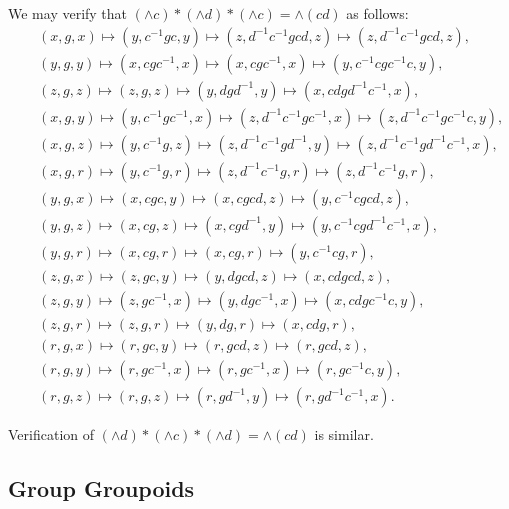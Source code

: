 \begin{pf}
We may verify that $(\wedge  c)*(\wedge  d)*(\wedge  c) = \wedge(cd)$ as follows: 
\begin{eqnarray*} 
  && (x,g,x) \mapsto (y, c^{-1}gc,y) \mapsto (z, d^{-1}c^{-1}gcd,z) \mapsto (z, d^{-1}c^{-1}gcd,z), \\
  && (y,g,y) \mapsto (x,cgc^{-1},x) \mapsto (x,cgc^{-1},x) \mapsto (y,c^{-1}cgc^{-1}c,y),  \\
  && (z,g,z) \mapsto (z,g,z) \mapsto (y,dgd^{-1},y) \mapsto (x,cdgd^{-1}c^{-1},x), \\
  && (x,g,y) \mapsto (y,c^{-1}gc^{-1},x) \mapsto (z,d^{-1}c^{-1}gc^{-1},x) \mapsto (z,d^{-1}c^{-1}gc^{-1}c,y), \\
  && (x,g,z) \mapsto (y,c^{-1}g,z) \mapsto (z,d^{-1}c^{-1}gd^{-1},y) \mapsto (z,d^{-1}c^{-1}gd^{-1}c^{-1},x), \\
  && (x,g,r) \mapsto (y,c^{-1}g,r) \mapsto (z,d^{-1}c^{-1}g,r) \mapsto (z,d^{-1}c^{-1}g,r), \\
  && (y,g,x) \mapsto (x,cgc,y) \mapsto (x,cgcd,z) \mapsto (y,c^{-1}cgcd,z), \\
  && (y,g,z) \mapsto (x,cg,z) \mapsto (x,cgd^{-1},y) \mapsto (y,c^{-1}cgd^{-1}c^{-1},x), \\
  && (y,g,r) \mapsto (x,cg,r) \mapsto (x,cg,r) \mapsto (y,c^{-1}cg,r), \\
  && (z,g,x) \mapsto (z,gc,y) \mapsto (y,dgcd,z) \mapsto (x,cdgcd,z),  \\
  && (z,g,y) \mapsto (z,gc^{-1},x) \mapsto (y,dgc^{-1},x) \mapsto (x,cdgc^{-1}c,y), \\ 
  && (z,g,r) \mapsto (z,g,r) \mapsto (y,dg,r) \mapsto (x,cdg,r), \\
  && (r,g,x) \mapsto (r,gc,y) \mapsto (r,gcd,z) \mapsto (r,gcd,z), \\ 
  && (r,g,y) \mapsto (r,gc^{-1},x) \mapsto (r,gc^{-1},x) \mapsto (r,gc^{-1}c,y), \\ 
  && (r,g,z) \mapsto (r,g,z) \mapsto (r,gd^{-1},y) \mapsto (r,gd^{-1}c^{-1},x).
\end{eqnarray*} 

Verification of $(\wedge  d)*(\wedge  c)*(\wedge  d) = \wedge(cd)$ is similar. 
\end{pf}



\subsection{Group Groupoids} \label{subs:gpgpd}  

